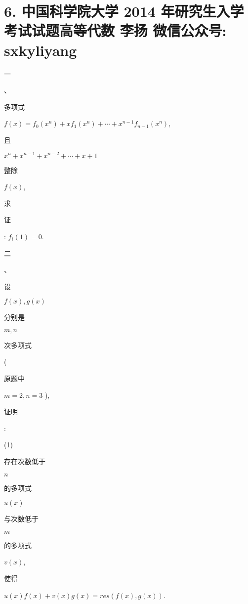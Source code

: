 \documentclass[10pt]{article}
\begin{document}
\section{6. 中国科学院大学 2014 年研究生入学考试试题高等代数 李扬 微信公众号: sxkyliyang}
\begin{CJK}{UTF8}{mj}一\end{CJK}、\begin{CJK}{UTF8}{mj}多项式\end{CJK} $f(x)=f_{0}\left(x^{n}\right)+x f_{1}\left(x^{n}\right)+\cdots+x^{n-1} f_{n-1}\left(x^{n}\right)$, \begin{CJK}{UTF8}{mj}且\end{CJK} $x^{n}+x^{n-1}+x^{n-2}+\cdots+x+1$ \begin{CJK}{UTF8}{mj}整除\end{CJK} $f(x)$, \begin{CJK}{UTF8}{mj}求\end{CJK} \begin{CJK}{UTF8}{mj}证\end{CJK}: $f_{i}(1)=0$.

\begin{CJK}{UTF8}{mj}二\end{CJK}、\begin{CJK}{UTF8}{mj}设\end{CJK} $f(x), g(x)$ \begin{CJK}{UTF8}{mj}分别是\end{CJK} $m, n$ \begin{CJK}{UTF8}{mj}次多项式\end{CJK}(\begin{CJK}{UTF8}{mj}原题中\end{CJK} $m=2, n=3$ ), \begin{CJK}{UTF8}{mj}证明\end{CJK}:

(1) \begin{CJK}{UTF8}{mj}存在次数低于\end{CJK} $n$ \begin{CJK}{UTF8}{mj}的多项式\end{CJK} $u(x)$ \begin{CJK}{UTF8}{mj}与次数低于\end{CJK} $m$ \begin{CJK}{UTF8}{mj}的多项式\end{CJK} $v(x)$, \begin{CJK}{UTF8}{mj}使得\end{CJK} $u(x) f(x)+v(x) g(x)=r e s(f(x), g(x))$.
\end{document}
